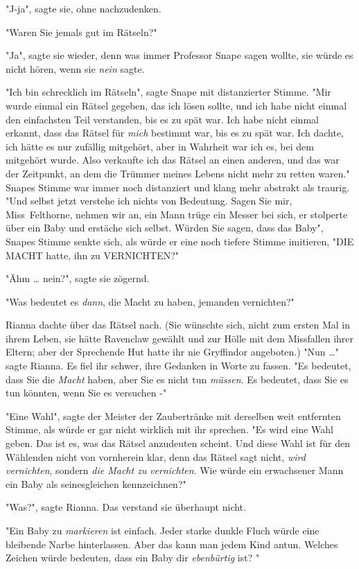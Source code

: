 {"J-ja", sagte sie, ohne nachzudenken.

"Waren Sie jemals gut im Rätseln?"

"Ja", sagte sie wieder, denn was immer Professor Snape sagen wollte, sie würde es nicht hören, wenn sie \emph{nein} sagte.

"Ich bin schrecklich im Rätseln", sagte Snape mit distanzierter Stimme. "Mir wurde einmal ein Rätsel gegeben, das ich lösen sollte, und ich habe nicht einmal den einfachsten Teil verstanden, bis es zu spät war. Ich habe nicht einmal erkannt, dass das Rätsel für \emph{mich} bestimmt war, bis es zu spät war. Ich dachte, ich hätte es nur zufällig mitgehört, aber in Wahrheit war ich es, bei dem mitgehört wurde. Also verkaufte ich das Rätsel an einen anderen, und das war der Zeitpunkt, an dem die Trümmer meines Lebens nicht mehr zu retten waren." Snapes Stimme war immer noch distanziert und klang mehr abstrakt als traurig. "Und selbst jetzt verstehe ich nichts von Bedeutung. Sagen Sie mir, Miss~Felthorne, nehmen wir an, ein Mann trüge ein Messer bei sich, er stolperte über ein Baby und erstäche sich selbst. Würden Sie sagen, dass das Baby", Snapes Stimme senkte sich, als würde er eine noch tiefere Stimme imitieren, "DIE MACHT hatte, ihn zu VERNICHTEN?"

"Ähm … nein?", sagte sie zögernd.

"Was bedeutet es \emph{dann}, die Macht zu haben, jemanden vernichten?"

Rianna dachte über das Rätsel nach. (Sie wünschte sich, nicht zum ersten Mal in ihrem Leben, sie hätte Ravenclaw gewählt und zur Hölle mit dem Missfallen ihrer Eltern; aber der Sprechende Hut hatte ihr nie Gryffindor angeboten.) "Nun …" sagte Rianna. Es fiel ihr schwer, ihre Gedanken in Worte zu fassen. "Es bedeutet, dass Sie die \emph{Macht} haben, aber Sie es nicht tun \emph{müssen}. Es bedeutet, dass Sie es tun könnten, wenn Sie es versuchen -"

"Eine Wahl", sagte der Meister der Zaubertränke mit derselben weit entfernten Stimme, als würde er gar nicht wirklich mit ihr sprechen. "Es wird eine Wahl geben. Das ist es, was das Rätsel anzudeuten scheint. Und diese Wahl ist für den Wählenden nicht von vornherein klar, denn das Rätsel sagt nicht, \emph{wird} \emph{vernichten}, sondern \emph{die Macht zu} \emph{vernichten}. Wie würde ein erwachsener Mann ein Baby als seinesgleichen kennzeichnen?"

"Was?", sagte Rianna. Das verstand sie überhaupt nicht.

"Ein Baby zu \emph{markieren} ist einfach. Jeder starke dunkle Fluch würde eine bleibende Narbe hinterlassen. Aber das kann man jedem Kind antun. Welches Zeichen würde bedeuten, dass ein Baby dir \emph{ebenbürtig} ist? "

}
